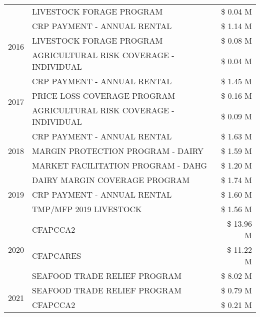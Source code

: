 \begin{tabular}{llr}
 & LIVESTOCK FORAGE PROGRAM & \$ 0.04 M \\
\cline{1-3}
\multirow[t]{3}{*}{2016} & CRP PAYMENT - ANNUAL RENTAL & \$ 1.14 M \\
 & LIVESTOCK FORAGE PROGRAM & \$ 0.08 M \\
 & AGRICULTURAL RISK COVERAGE - INDIVIDUAL & \$ 0.04 M \\
\cline{1-3}
\multirow[t]{3}{*}{2017} & CRP PAYMENT - ANNUAL RENTAL & \$ 1.45 M \\
 & PRICE LOSS COVERAGE PROGRAM & \$ 0.16 M \\
 & AGRICULTURAL RISK COVERAGE - INDIVIDUAL & \$ 0.09 M \\
\cline{1-3}
\multirow[t]{3}{*}{2018} & CRP PAYMENT - ANNUAL RENTAL & \$ 1.63 M \\
 & MARGIN PROTECTION PROGRAM - DAIRY & \$ 1.59 M \\
 & MARKET FACILITATION PROGRAM - DAHG & \$ 1.20 M \\
\cline{1-3}
\multirow[t]{3}{*}{2019} & DAIRY MARGIN COVERAGE PROGRAM & \$ 1.74 M \\
 & CRP PAYMENT - ANNUAL RENTAL & \$ 1.60 M \\
 & TMP/MFP 2019 LIVESTOCK & \$ 1.56 M \\
\cline{1-3}
\multirow[t]{3}{*}{2020} & CFAPCCA2 & \$ 13.96 M \\
 & CFAPCARES & \$ 11.22 M \\
 & SEAFOOD TRADE RELIEF PROGRAM & \$ 8.02 M \\
\cline{1-3}
\multirow[t]{2}{*}{2021} & SEAFOOD TRADE RELIEF PROGRAM & \$ 0.79 M \\
 & CFAPCCA2 & \$ 0.21 M \\
\cline{1-3}
\bottomrule
\end{tabular}
